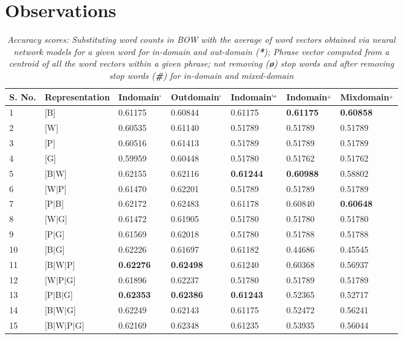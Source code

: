 \section{Observations}
\begin{table*}[htb]
\small
\captionsetup{font=small,belowskip=1pt,aboveskip=1pt}
\centering
\begin{tabular}{l|l|l|l|l|l|l}
\hline
{\color[HTML]{000000} {\bf S. No.}} & {\color[HTML]{000000} {\bf Representation}} & {\color[HTML]{000000} {\bf Indomain$^{_{*}}$}} & {\color[HTML]{000000} {\bf Outdomain$^{_{*}}$}} &{\color[HTML]{000000} {\bf Indomain$^{_{\o}}$}} & {\color[HTML]{000000} {\bf Indomain$^{_{\#}}$}} & {\color[HTML]{000000} {\bf Mixdomain$^{_{\#}}$}} \\ \hline
1 & [B] & 0.61175 & 0.60844 & 0.61175 & \textbf{0.61175} & \textbf{0.60858} \\ \hline
2 & [W] & 0.60535 & 0.61140 & 0.51789 & 0.51789 & 0.51789 \\ \hline
3 & [P] & 0.60516 & 0.61413 & 0.51789 & 0.51789 & 0.51789 \\ \hline
4 & [G] & 0.59959 & 0.60448 & 0.51780 & 0.51762 & 0.51762 \\ \hline
5 & {[}B$|$W{]} & 0.62155 & 0.62116 & \textbf{0.61244} & \textbf{0.60988} & 0.58802 \\ \hline
6 & {[}W$|$P{]} & 0.61470 & 0.62201 & 0.51789 & 0.51789 & 0.51789 \\ \hline
7 & {[}P$|$B{]} & 0.62172 &  0.62483 & 0.61178 & 0.60840 & \textbf{0.60648} \\ \hline
8 & {[}W$|$G{]} & 0.61472 & 0.61905 & 0.51780 & 0.51780 & 0.51780 \\ \hline
9 & {[}P$|$G{]} & 0.61569 & 0.62018 & 0.51780 & 0.51788 & 0.51788 \\ \hline
10 & {[}B$|$G{]} & 0.62226 & 0.61697 & 0.61182 & 0.44686 & 0.45545 \\ \hline
11 & {[}B$|$W$|$P{]} & \textbf{0.62276} & \textbf{0.62498} & 0.61240 & 0.60368 & 0.56937 \\ \hline
12 & {[}W$|$P$|$G{]} & 0.61896 & 0.62237 & 0.51780 & 0.51789 & 0.51789 \\ \hline
13 & {[}P$|$B$|$G{]} & \textbf{0.62353} & \textbf{0.62386} & \textbf{0.61243} & 0.52365 & 0.52717 \\ \hline
14 & {[}B$|$W$|$G{]} & 0.62249 & 0.62143 & 0.61175 & 0.52472 & 0.56241 \\ \hline
15 & {[}B$|$W$|$P$|$G{]} & 0.62169 & 0.62348 & 0.61235 & 0.53935 & 0.56044 \\ \hline
\end{tabular}

\caption{\textit{Accuracy scores: Substituting word counts in BOW with the average of word vectors obtained via neural network models for a given word for in-domain and out-domain (\textbf{*}); Phrase vector computed from a centroid of all the word vectors within a given phrase; not removing (\textbf{\o}) stop words and after removing stop words (\textbf{\#}) for in-domain and mixed-domain}}
\label{table:phraserep}
\end{table*}
	
